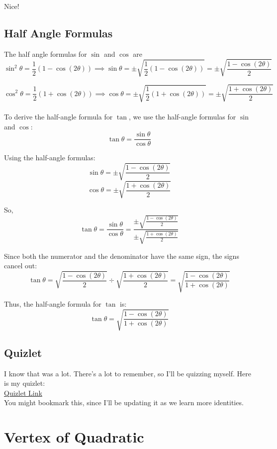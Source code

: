 \documentclass[12pt]{article}
\begin{document}
Nice!

\subsection{Half Angle Formulas}

The half angle formulas for \(\sin\) and \(\cos\) are\\
  
\[
\sin^2\theta = \frac{1}{2}(1 - \cos(2\theta)) \implies \sin\theta = \pm \sqrt{\frac{1}{2}\left(1 - \cos(2\theta)\right)} = \pm \sqrt{\frac{1 - \cos(2\theta)}{2}}
\]

\[
\cos^2\theta = \frac{1}{2}(1 + \cos(2\theta)) \implies \cos\theta = \pm \sqrt{\frac{1}{2}\left(1 + \cos(2\theta)\right)} = \pm \sqrt{\frac{1 + \cos(2\theta)}{2}}
\]\\

To derive the half-angle formula for \(\tan\), we use the half-angle formulas for \(\sin\) and \(\cos\):
\[
\tan \theta = \frac{\sin \theta}{\cos \theta}
\]

Using the half-angle formulas:
\[
\sin \theta = \pm \sqrt{\frac{1 - \cos(2\theta)}{2}}
\]
\[
\cos \theta = \pm \sqrt{\frac{1 + \cos(2\theta)}{2}}
\]

So,
\[
\tan \theta = \frac{\sin \theta}{\cos \theta} = \frac{\pm \sqrt{\frac{1 - \cos(2\theta)}{2}}}{\pm \sqrt{\frac{1 + \cos(2\theta)}{2}}}
\]

Since both the numerator and the denominator have the same sign, the signs cancel out:
\[
\tan \theta = \sqrt{\frac{1 - \cos(2\theta)}{2}} \div \sqrt{\frac{1 + \cos(2\theta)}{2}} = \sqrt{\frac{1 - \cos(2\theta)}{1 + \cos(2\theta)}}
\]

Thus, the half-angle formula for \(\tan\) is:
\[
\tan \theta = \sqrt{\frac{1 - \cos(2\theta)}{1 + \cos(2\theta)}}
\]

\subsection{Quizlet}

I know that was a lot. There's a lot to remember, so I'll be quizzing myself. Here is my quizlet:\\

\href{https://quizlet.com/928964860/learn}{Quizlet Link}\\

You might bookmark this, since I'll be updating it as we learn more identities.\\

\section{Vertex of Quadratic}
\end{document}
